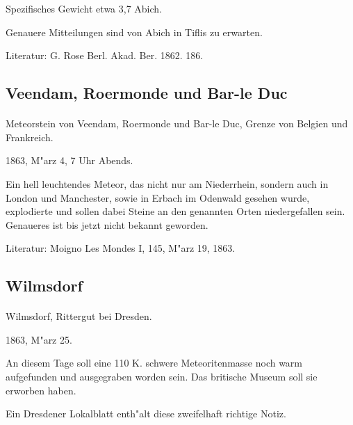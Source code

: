 \documentclass[a4paper, 11pt, oneside]{article}
\begin{document}
Spezifisches Gewicht etwa 3,7 Abich.

Genauere Mitteilungen sind von Abich in Tiflis zu erwarten.

Literatur: G. Rose Berl. Akad. Ber. 1862. 186.

\subsection{Veendam, Roermonde und Bar-le Duc}
\normalsize
\paragraph{}
Meteorstein von Veendam, Roermonde und Bar-le Duc, Grenze von Belgien und Frankreich.

1863, M"arz 4, 7 Uhr Abends.

Ein hell leuchtendes Meteor, das nicht nur am Niederrhein, sondern auch in London und Manchester, sowie in Erbach im Odenwald gesehen wurde, explodierte und sollen dabei Steine an den genannten Orten niedergefallen sein. Genaueres ist bis jetzt nicht bekannt geworden.

Literatur: Moigno Les Mondes I, 145, M"arz 19, 1863.

\subsection{Wilmsdorf}
\normalsize
\paragraph{}
Wilmsdorf, Rittergut bei Dresden.

1863, M"arz 25.

An diesem Tage soll eine 110 K. schwere Meteoritenmasse noch warm aufgefunden und ausgegraben worden sein. Das britische Museum soll sie erworben haben.

Ein Dresdener Lokalblatt enth"alt diese zweifelhaft richtige Notiz.
\clearpage
\end{document}
